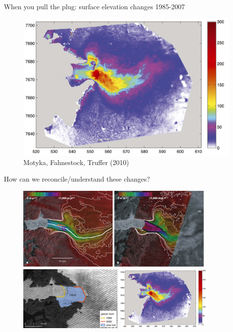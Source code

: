 \documentclass[hide notes,intlimits]{beamer}
\begin{document}
{
%
} 

\begin{frame}{When you pull the plug: surface elevation changes 1985-2007}

  \begin{figure}
    \includegraphics[width=.8\textwidth]{jib-obs-surface-diff-motyka} \\
    \footnotesize{Motyka, Fahnestock, Truffer (2010)}
  \end{figure}
\end{frame}


\begin{frame}{How can we reconcile/understand these changes?}
 \begin{figure}
    \includegraphics[height=4.15cm]{Joughin2004Fig2} \\
    \includegraphics[height=3.20cm]{jib-front-1990-2005-change}
    \includegraphics[height=3.20cm]{jib-obs-surface-diff-motyka}
  \end{figure}
\end{frame}
\end{document}
